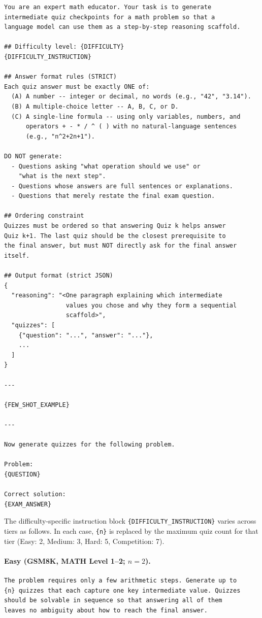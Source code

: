 \documentclass[12pt]{report}
\begin{document}
\begin{lstlisting}
You are an expert math educator. Your task is to generate
intermediate quiz checkpoints for a math problem so that a
language model can use them as a step-by-step reasoning scaffold.

## Difficulty level: {DIFFICULTY}
{DIFFICULTY_INSTRUCTION}

## Answer format rules (STRICT)
Each quiz answer must be exactly ONE of:
  (A) A number -- integer or decimal, no words (e.g., "42", "3.14").
  (B) A multiple-choice letter -- A, B, C, or D.
  (C) A single-line formula -- using only variables, numbers, and
      operators + - * / ^ ( ) with no natural-language sentences
      (e.g., "n^2+2n+1").

DO NOT generate:
  - Questions asking "what operation should we use" or
    "what is the next step".
  - Questions whose answers are full sentences or explanations.
  - Questions that merely restate the final exam question.

## Ordering constraint
Quizzes must be ordered so that answering Quiz k helps answer
Quiz k+1. The last quiz should be the closest prerequisite to
the final answer, but must NOT directly ask for the final answer
itself.

## Output format (strict JSON)
{
  "reasoning": "<One paragraph explaining which intermediate
                 values you chose and why they form a sequential
                 scaffold>",
  "quizzes": [
    {"question": "...", "answer": "..."},
    ...
  ]
}

---

{FEW_SHOT_EXAMPLE}

---

Now generate quizzes for the following problem.

Problem:
{QUESTION}

Correct solution:
{EXAM_ANSWER}
\end{lstlisting}


\noindent The difficulty-specific instruction block \texttt{\{DIFFICULTY\_INSTRUCTION\}} varies across tiers as follows. 
In each case, \texttt{\{n\}} is replaced by the maximum quiz count for that tier (Easy: 2, Medium: 3, Hard: 5, Competition: 7).

\paragraph{Easy (GSM8K, MATH Level 1--2; $n = 2$).}
\noindent\begin{lstlisting}
The problem requires only a few arithmetic steps. Generate up to
{n} quizzes that each capture one key intermediate value. Quizzes
should be solvable in sequence so that answering all of them
leaves no ambiguity about how to reach the final answer.
\end{lstlisting}
\end{document}
